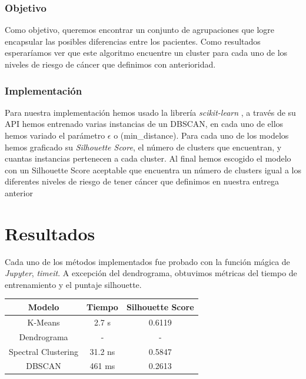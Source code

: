 \documentclass[journal]{IEEEtran}
\begin{document}
            \subsubsection{Objetivo}

                Como objetivo, queremos encontrar un conjunto de agrupaciones que logre encapsular las posibles diferencias entre los pacientes. Como resultados esperaríamos ver que este algoritmo encuentre un cluster para cada uno de los niveles de riesgo de cáncer que definimos con anterioridad.
            
            \vspace*{2mm}
            \subsubsection{Implementación}

                Para nuestra implementación hemos usado la librería \emph{scikit-learn} \cite{scikit-learn}, a través de su API hemos entrenado varias instancias de un DBSCAN, en cada uno de ellos hemos variado el parámetro $\epsilon$ o (min\_distance). Para cada uno de los modelos hemos graficado su \emph{Silhouette Score}, el número de clusters que encuentran, y cuantas instancias pertenecen a cada cluster. Al final hemos escogido el modelo con un Silhouette Score aceptable que encuentra un número de clusters igual a los diferentes niveles de riesgo de tener cáncer que definimos en nuestra entrega anterior
    
    \vspace*{2mm}
    \section{Resultados} \label{resultados}
        
        Cada uno de los métodos implementados fue probado con la función mágica de \emph{Jupyter}, \emph{timeit}. A excepción del dendrograma, obtuvimos métricas del tiempo de entrenamiento y el puntaje silhouette.
        
        \begin{center}
            \begin{tabular}{|c|c|c|}
                \hline
                Modelo & Tiempo & Silhouette Score \\
                \hline
                K-Means & 2.7 s & 0.6119 \\
                \hline
                Dendrograma & - & - \\
                \hline
                Spectral Clustering & 31.2 ns & 0.5847 \\
                \hline
                DBSCAN & 461 ms & 0.2613 \\
                \hline
            \end{tabular}
        \end{center}
    
\end{document}
